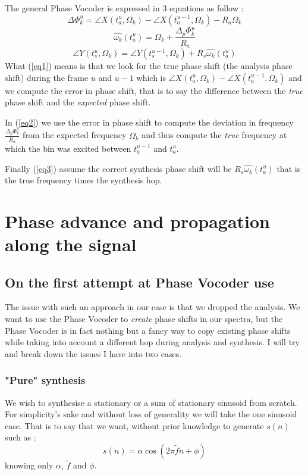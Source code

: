 \documentclass[]{article}
\begin{document}
The general Phase Vocoder is expressed in 3 equations as follow :
\begin{equation}\label{eq1}
\Delta \Phi_{k}^{u} = \angle X(t_a^u, \Omega_k) - \angle X(t_a^{u-1}, \Omega_k) - R_a \Omega_k
\end{equation}
\begin{equation}\label{eq2}
\hat{\omega_k}(t_a^u) = \Omega_k + \frac{\Delta_p \Phi_{k}^u}{R_a}
\end{equation}
\begin{equation}\label{eq3}
\angle Y(t_s^u, \Omega_k) = \angle Y(t_s^{u-1}, \Omega_k) + R_s \hat{\omega_k}(t_a^u)
\end{equation}
What (\ref{eq1}) means is that we look for the true phase shift (the analysis phase shift) during the frame $u$ and $u-1$ which is $\angle X(t_a^u, \Omega_k) - \angle X(t_a^{u-1}, \Omega_k)$ and we compute the error in phase shift, that is to say the difference between the \emph{true} phase shift and the \emph{expected} phase shift.

In (\ref{eq2}) we use the error in phase shift to compute the deviation in frequency $\frac{\Delta_p \Phi_{k}^u}{R_a}$ from the expected frequency $\Omega_k$ and thus compute the \emph{true} frequency at which the bin was excited between $t_a^{u-1}$ and $t_a^{u}$.

Finally (\ref{eq3}) assume the correct synthesis phase shift will be $R_s\hat{\omega_k}(t_a^u)$ that is the true frequency times the synthesis hop.

\section{Phase advance and propagation along the signal}\label{phase-advance}
\subsection{On the first attempt at Phase Vocoder use}
The issue with such an approach in our case is that we dropped the analysis. We want to use the Phase Vocoder to \emph{create} phase shifts in our spectra, but the Phase Vocoder is in fact nothing but a fancy way to copy existing phase shifts while taking into account a different hop during analysis and synthesis. I will try and break down the issues I have into two cases.


\subsubsection{"Pure" synthesis}\label{puresynth}
We wish to synthesise a stationary or a sum of stationary sinusoid from scratch. For simplicity's sake and without loss of generality we will take the one sinusoid case.
That is to say that we want, without prior knowledge to generate $s(n)$ such as :
\begin{equation}\label{statSignal}
s(n) = \alpha \cos(2\pi\tilde{f} n + \phi)
\end{equation}
knowing only $\alpha$, $\tilde{f}$ and $\phi$.
\end{document}
